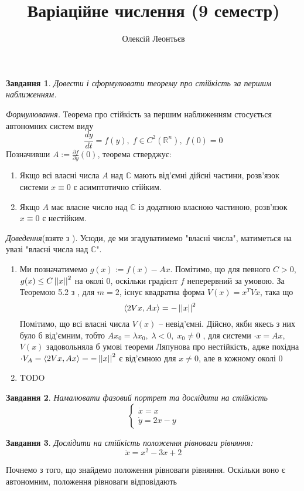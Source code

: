 \documentclass[12pt]{article} %
\title{Варіаційне числення (9 семестр)}
\author{Олексій Леонтьєв}
\newtheorem{prob}{Завдання}
\begin{document}
\maketitle
\begin{prob}Довести і сформулювати теорему про стійкість за першим наближенням.\end{prob}%
	{\it Формулювання. }Теорема про стійкість за першим наближенням стосується автономних систем виду
	\[\frac{dy}{dt}=f(y),\;f\in C^2(\mathbb{R}^n),\;f(0)=0\]
	Позначивши $A:=\frac{\partial f}{\partial y}(0)$, теорема стверджує:
	\begin{enumerate}
		\item Якщо всі власні числа $A$ над $\mathbb{C}$ мають від’ємні дійсні частини, розв’язок системи $x\equiv0$ є
			асимптотично стійким.
		\item Якщо $A$ має власне число над $\mathbb{C}$ із додатною власною частиною, розв’язок $x\equiv0$ є нестійким.
	\end{enumerate}
	{\it Доведення}(взяте з \cite{perestyuk}).
	Усюди, де ми згадуватимемо "власні числа", матиметься на увазі "власні числа над $\mathbb{C}$".
	\begin{enumerate}
		\item Ми позначатимемо $g(x):=f(x)-Ax$. Помітимо, що для певного $C>0$, $g(x)\leq C\left|\left|x\right|\right|^2$ на околі $0$,
			оскільки градієнт $f$ неперервний за умовою. За Теоремою 5.2 з \cite{perestyuk}, для $m=2$, існує
			квадратна форма $V(x)=x^TVx$, така що \[\left<2Vx,Ax\right>=-\left|\left|x\right|\right|^2\] Помітимо, що всі власні
			числа $V(x)$ -- невід’ємні. Дійсно, якби якесь з них було б від’ємним, тобто $Ax_0=\lambda x_0,\;\lambda<0,\;
			x_0\neq0$
			, для системи $\cdot{x}=Ax$, 
			$V(x)$ задовольняла б умові теореми Ляпунова про нестійкість, адже похідна $\cdot{V}_{A}
			=\left<2Vx,Ax\right>=-\left|\left|x\right|\right|^2$ є від’ємною для $x\neq0$, але в кожному околі $0$
		\item TODO
	\end{enumerate}
\begin{prob}Намалювати фазовий портрет та дослідити на стійкість%
	\[\begin{cases}\dot{x}=x\\\dot{y}=2x-y\end{cases}\]\end{prob}
\begin{prob}Дослідити на стійкість положення рівноваги рівняння:\[\dot{x}=x^2-3x+2\]\end{prob}
Почнемо з того, що знайдемо положення рівноваги рівняння. Оскільки воно є автономним, положення рівноваги відповідають
\end{document}
